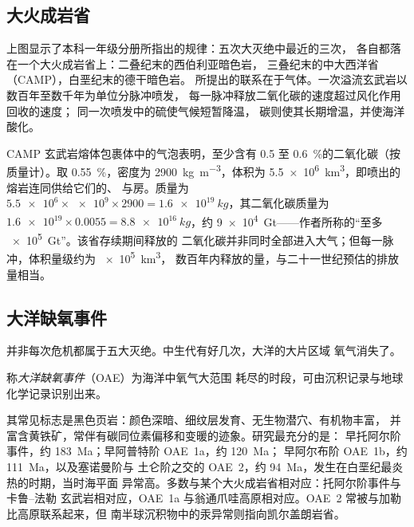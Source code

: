 \subsection*{大火成岩省}

上图显示了本科一年级分册所指出的规律：五次大灭绝中最近的三次，
各自都落在一个大火成岩省上：二叠纪末的西伯利亚暗色岩，
三叠纪末的中大西洋省（CAMP），白垩纪末的德干暗色岩。
所提出的联系在于气体。一次溢流玄武岩以数百年至数千年为单位分脉冲喷发，
每一脉冲释放二氧化碳的速度超过风化作用回收的速度；
同一次喷发中的硫使气候短暂降温，
碳则使其长期增温，并使海洋酸化。

\begin{example}[中大西洋岩浆省的碳]\label{ex:b2:phanerozoic-earth:camp}
CAMP 玄武岩熔体包裹体中的气泡表明，至少含有 0.5 至
\qty{0.6}{\percent}的二氧化碳（按质量计）。取 \qty{0.55}{\percent}，密度为
\qty{2900}{kg.m^{-3}}，体积为 \qty{5.5e6}{km^3}，即喷出的熔岩连同供给它们的、
与房。质量为 $\num{5.5e6} \times \num{e9} \times 2900 =
\qty{1.6e19}{kg}$，其二氧化碳质量为 $\num{1.6e19} \times 0.0055 = \qty{8.8e16}{kg}$，约
\qty{9e4}{Gt}——作者所称的“至多 \qty{e5}{Gt}”。该省存续期间释放的
二氧化碳并非同时全部进入大气；但每一脉冲，体积量级约为 \qty{e5}{km^3}，
数百年内释放的量，与二十一世纪预估的排放量相当。
\end{example}

\subsection*{大洋缺氧事件}

并非每次危机都属于五大灭绝。中生代有好几次，大洋的大片区域
氧气消失了。

\begin{definition}[大洋缺氧事件]\label{def:b2:phanerozoic-earth:oae}
称\emph{大洋缺氧事件}（OAE）为海洋中氧气大范围
耗尽的时段，可由沉积记录与地球化学记录识别出来。
\end{definition}

其常见标志是黑色页岩：颜色深暗、细纹层发育、无生物潜穴、有机物丰富，
并富含黄铁矿，常伴有碳同位素偏移和变暖的迹象。研究最充分的是：
早托阿尔阶事件，约 \qty{183}{Ma}；早阿普特阶 OAE~1a，约 \qty{120}{Ma}；
早阿尔布阶 OAE~1b，约 \qty{111}{Ma}，以及塞诺曼阶与
土仑阶之交的 OAE~2，约 \qty{94}{Ma}，发生在白垩纪最炎热的时期，当时海平面
异常高。多数与某个大火成岩省相对应：托阿尔阶事件与卡鲁–法勒
玄武岩相对应，OAE~1a 与翁通爪哇高原相对应。OAE~2 常被与加勒比高原联系起来，但
南半球沉积物中的汞异常则指向凯尔盖朗岩省。

